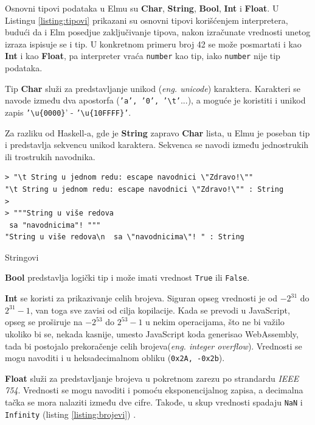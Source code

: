 \documentclass[12pt,oneside]{memoir}
\begin{document}
Osnovni tipovi podataka u Elmu su \textbf{Char}, \textbf{String}, \textbf{Bool}, 
\textbf{Int} i \textbf{Float}. U Listingu \ref{listing:tipovi} prikazani su osnovni 
tipovi korišćenjem interpretera, budući da i Elm posedjue zaključivanje tipova, nakon 
izračunate vrednosti unetog izraza ispisuje se i tip. U konkretnom primeru broj 42 se 
može posmartati i kao \textbf{Int} i kao \textbf{Float}, pa interpreter vraća 
\texttt{number} kao tip, iako \texttt{number} nije tip podataka.


Tip \textbf{Char} služi za predstavljanje unikod (\emph{eng. unicode}) karaktera. 
Karakteri se navode između dva apostorfa (\texttt{'a', '0', '\textbackslash t'}...), a 
moguće je koristiti i unikod zapis  \texttt{'\textbackslash u\{0000\}}' - 
\texttt{'\textbackslash u\{10FFFF\}'}.

Za razliku od Haskell-a, gde je \textbf{String} zapravo \textbf{Char} lista, u Elmu je 
poseban tip i predstavlja sekvencu unikod karaktera. Sekvenca se navodi između 
jednostrukih ili trostrukih navodnika. 

\begin{listing}[ht]
\begin{verbatim}
> "\t String u jednom redu: escape navodnici \"Zdravo!\""
"\t String u jednom redu: escape navodnici \"Zdravo!\"" : String
>
> """String u više redova
 sa "navodnicima"! """
"String u više redova\n  sa \"navodnicima\"! " : String
\end{verbatim}
\caption{Stringovi}
\label{listing:string}
\end{listing}

\textbf{Bool} predstavlja logički tip i može imati vrednost \texttt{True} ili \texttt{False}. 

\textbf{Int} se koristi za prikazivanje celih brojeva. Siguran opseg vrednosti je 
od \(-2^{31}\) do \(2^{31} - 1\), van toga sve zavisi od cilja kopilacije. Kada se 
prevodi u JavaScript, opseg se proširuje na \(-2^{53}\) do \(2^{53} - 1\) u nekim 
operacijama, što ne bi važilo ukoliko bi se, nekada kasnije, umesto JavaScript koda 
generisao WebAssembly, tada bi postojalo prekoračenje celih brojeva(\emph{eng. integer 
overflow}). Vrednosti se mogu navoditi i u heksadecimalnom obliku  (\texttt{0x2A, -0x2b}).

\textbf{Float} služi za predstavljanje brojeva u pokretnom zarezu po strandardu 
\emph{IEEE 754}. Vrednosti se mogu navoditi i pomoću eksponencijalnog zapisa, a decimalna 
tačka se mora nalaziti između dve cifre. Takođe, u skup vrednosti spadaju \texttt{NaN} i 
\texttt{Infinity} (listing \ref{listing:brojevi}) .
\end{document}
